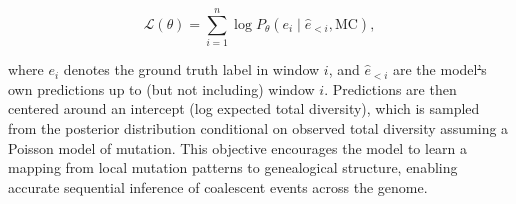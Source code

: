 \documentclass[9pt,twocolumn,twoside]{pnas-new} %
\makeatletter
\providecommand{\DIFadd}[1]{{\protect\color{blue}\uwave{#1}}} %
\providecommand{\DIFdel}[1]{{\protect\color{red}\sout{#1}}} %
\providecommand{\DIFaddbegin}{} %
\providecommand{\DIFaddend}{} %
\providecommand{\DIFdelbegin}{} %
\providecommand{\DIFdelend}{} %
\let\sout@orig\sout %
\renewcommand{\sout}[1]{\ifmmode\text{\sout@orig{\ensuremath{#1}}}\else\sout@orig{#1}\fi} %
\makeatother
\begin{document}
\[
 \mathcal{L}(\theta) = \sum_{i=1}^{n} \log P_\theta(e_i \mid \hat{e}_{<i}, \text{MC}),
\]

where \( e_i \) denotes the ground truth label in window \( i \), and \( \hat{e}_{<i} \) 
are the model\DIFdelbegin \DIFdel{’}\DIFdelend \DIFaddbegin \DIFadd{'}\DIFaddend s own predictions up to (but not including) window $i$. Predictions are then 
centered around an intercept (log expected total diversity), which is sampled from the 
posterior distribution conditional on observed total diversity assuming a Poisson model of 
mutation.
This objective encourages the model to learn a mapping from local mutation patterns to
genealogical structure, enabling accurate sequential inference of coalescent events across the genome.
\end{document}
